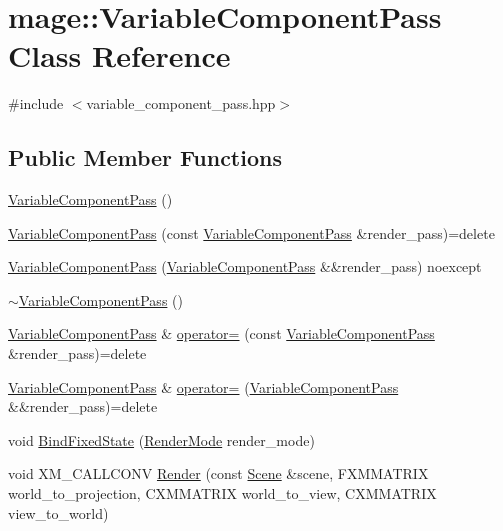 \hypertarget{classmage_1_1_variable_component_pass}{}\section{mage\+:\+:Variable\+Component\+Pass Class Reference}
\label{classmage_1_1_variable_component_pass}


{\ttfamily \#include $<$variable\+\_\+component\+\_\+pass.\+hpp$>$}

\subsection*{Public Member Functions}
\begin{DoxyCompactItemize}
\item 
\hyperlink{classmage_1_1_variable_component_pass_a86224a1702761665451b3c6e78557261}{Variable\+Component\+Pass} ()
\item 
\hyperlink{classmage_1_1_variable_component_pass_a535ac4989db673e69870090494f454dd}{Variable\+Component\+Pass} (const \hyperlink{classmage_1_1_variable_component_pass}{Variable\+Component\+Pass} \&render\+\_\+pass)=delete
\item 
\hyperlink{classmage_1_1_variable_component_pass_a3e6d3187fb5e17d592915a22407c44be}{Variable\+Component\+Pass} (\hyperlink{classmage_1_1_variable_component_pass}{Variable\+Component\+Pass} \&\&render\+\_\+pass) noexcept
\item 
\hyperlink{classmage_1_1_variable_component_pass_addf03c307a88e6a1871f0ec3adbb8bcb}{$\sim$\+Variable\+Component\+Pass} ()
\item 
\hyperlink{classmage_1_1_variable_component_pass}{Variable\+Component\+Pass} \& \hyperlink{classmage_1_1_variable_component_pass_a9df39d8323fea2b411a4f84abe8bac3c}{operator=} (const \hyperlink{classmage_1_1_variable_component_pass}{Variable\+Component\+Pass} \&render\+\_\+pass)=delete
\item 
\hyperlink{classmage_1_1_variable_component_pass}{Variable\+Component\+Pass} \& \hyperlink{classmage_1_1_variable_component_pass_ab4c2ccc632031ec51c16f7c9d500e427}{operator=} (\hyperlink{classmage_1_1_variable_component_pass}{Variable\+Component\+Pass} \&\&render\+\_\+pass)=delete
\item 
void \hyperlink{classmage_1_1_variable_component_pass_af020fa18b0df2abe39d953d9e78db37d}{Bind\+Fixed\+State} (\hyperlink{namespacemage_a5e7e18b0154373ce8fc942fe3f6b27fd}{Render\+Mode} render\+\_\+mode)
\item 
void X\+M\+\_\+\+C\+A\+L\+L\+C\+O\+NV \hyperlink{classmage_1_1_variable_component_pass_a343fd1c240fb8b32c512466aeffe73d7}{Render} (const \hyperlink{classmage_1_1_scene}{Scene} \&scene, F\+X\+M\+M\+A\+T\+R\+IX world\+\_\+to\+\_\+projection, C\+X\+M\+M\+A\+T\+R\+IX world\+\_\+to\+\_\+view, C\+X\+M\+M\+A\+T\+R\+IX view\+\_\+to\+\_\+world)
\end{DoxyCompactItemize}

